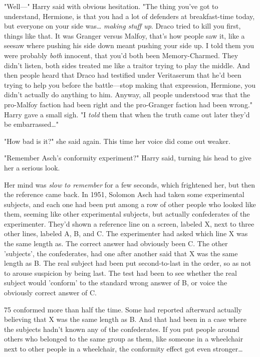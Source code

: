 "Well---" Harry said with obvious hesitation. "The thing you've got to 
understand, Hermione, is that you had a lot of defenders at breakfast-time 
today, but everyone on your side was{\ldots} \emph{making stuff up}. Draco 
tried to kill you first, things like that. It was Granger versus Malfoy, that's 
how people saw it, like a seesaw where pushing his side down meant pushing your 
side up. I told them you were probably \emph{both} innocent, that you'd both 
been Memory-Charmed. They didn't listen, both sides treated me like a traitor 
trying to play the middle. And then people heard that Draco had testified under 
Veritaserum that he'd been trying to help you before the battle---stop making 
that expression, Hermione, you didn't actually do anything to him. Anyway, all 
people understood was that the pro-Malfoy faction had been right and the 
pro-Granger faction had been wrong." Harry gave a small sigh. "I \emph{told} 
them that when the truth came out later they'd be embarrassed{\ldots}"

"How bad is it?" she said again. This time her voice did come out weaker.

"Remember Asch's conformity experiment?" Harry said, turning his head to give 
her a serious look.

Her mind was \emph{slow to remember} for a few seconds, which frightened her, 
but then the reference came back. In 1951, Solomon Asch had taken some 
experimental subjects, and each one had been put among a row of other people 
who looked like them, seeming like other experimental subjects, but actually 
confederates of the experimenter. They'd shown a reference line on a screen, 
labeled X, next to three other lines, labeled A, B, and C. The experimenter had 
asked which line X was the same length as. The correct answer had obviously 
been C. The other 'subjects', the confederates, had one after another said that 
X was the same length as B. The real subject had been put second-to-last in the 
order, so as not to arouse suspicion by being last. The test had been to see 
whether the real subject would 'conform' to the standard wrong answer of B, or 
voice the obviously correct answer of C.

75%
conformed more than half the time. Some had reported afterward actually 
believing that X was the same length as B. And that had been in a case where 
the subjects hadn't known any of the confederates. If you put people around 
others who belonged to the same group as them, like someone in a wheelchair 
next to other people in a wheelchair, the conformity effect got even 
stronger{\ldots}

